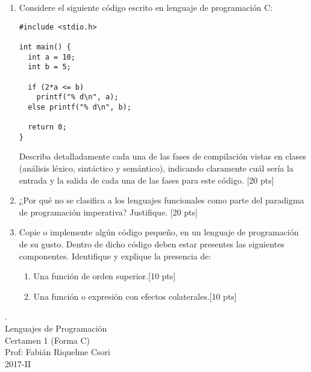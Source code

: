 \documentclass[letter,12pt,oneside]{book}
\theoremstyle{definition}
\begin{document}
\begin{enumerate}
    \item Considere el siguiente código escrito en lenguaje de programación C:
    
    \begin{lstlisting}[style=CStyle]
#include <stdio.h>

int main() {
  int a = 10;
  int b = 5;
  
  if (2*a <= b)
    printf("% d\n", a);
  else printf("% d\n", b);
  
  return 0;
}
\end{lstlisting}
Describa detalladamente cada una de las fases de compilación vistas en clases (análisis léxico, sintáctico y semántico), indicando claramente cuál sería la entrada y la salida de cada una de las fases para este código. \tabto{80ex}[20 pts]
    
\item ¿Por qué no se clasifica a los lenguajes funcionales como parte del paradigma de programación imperativa? Justifique. \tabto{80ex}[20 pts]

\item Copie o implemente algún código pequeño, en un lenguaje de programación de su gusto. Dentro de dicho código deben estar presentes las siguientes componentes. Identifique y explique la presencia de:
    \begin{enumerate}
    \item Una función de orden superior.\tabto{75ex}[10 pts]
    \item Una función o expresión con efectos colaterales.\tabto{75ex}[10 pts]
    \end{enumerate}
\end{enumerate}

\newpage

\begin{center}
 {\Large
  {\color{white}.}\\[5ex]
  Lenguajes de Programación\\[1ex]
  Certamen 1 (Forma C)}\\[1.2ex]
  Prof: Fabián Riquelme Csori\\
  2017-II
\end{center}
\end{document}
